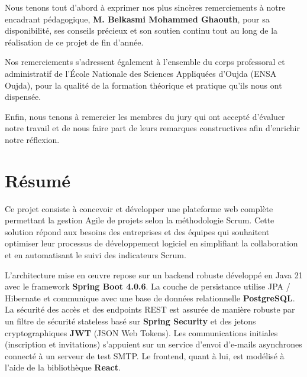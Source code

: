 \documentclass[12pt,a4paper]{report}
\begin{document}
Nous tenons tout d'abord à exprimer nos plus sincères remerciements à notre encadrant pédagogique, \textbf{M. Belkasmi Mohammed Ghaouth}, pour sa disponibilité, ses conseils précieux et son soutien continu tout au long de la réalisation de ce projet de fin d'année.

Nos remerciements s'adressent également à l'ensemble du corps professoral et administratif de l'École Nationale des Sciences Appliquées d'Oujda (ENSA Oujda), pour la qualité de la formation théorique et pratique qu'ils nous ont dispensée.

Enfin, nous tenons à remercier les membres du jury qui ont accepté d'évaluer notre travail et de nous faire part de leurs remarques constructives afin d'enrichir notre réflexion.


\chapter*{Résumé}

Ce projet consiste à concevoir et développer une plateforme web complète permettant la gestion Agile de projets selon la méthodologie Scrum. Cette solution répond aux besoins des entreprises et des équipes qui souhaitent optimiser leur processus de développement logiciel en simplifiant la collaboration et en automatisant le suivi des indicateurs Scrum.

L'architecture mise en œuvre repose sur un backend robuste développé en Java 21 avec le framework \textbf{Spring Boot 4.0.6}. La couche de persistance utilise JPA / Hibernate et communique avec une base de données relationnelle \textbf{PostgreSQL}. La sécurité des accès et des endpoints REST est assurée de manière robuste par un filtre de sécurité stateless basé sur \textbf{Spring Security} et des jetons cryptographiques \textbf{JWT} (JSON Web Tokens). Les communications initiales (inscription et invitations) s'appuient sur un service d'envoi d'e-mails asynchrones connecté à un serveur de test SMTP. Le frontend, quant à lui, est modélisé à l'aide de la bibliothèque \textbf{React}.
\end{document}

